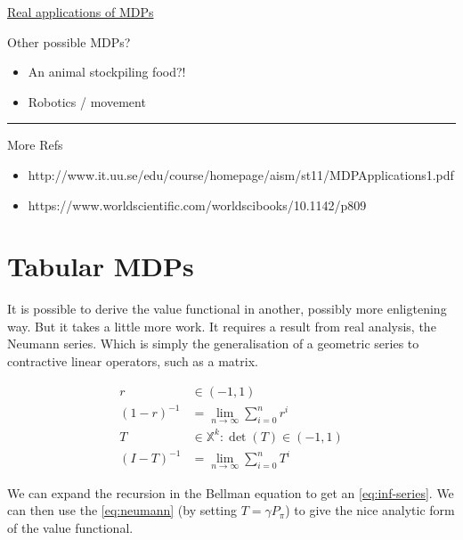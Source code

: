 \href{http://www.it.uu.se/edu/course/homepage/aism/st11/MDPApplications1.pdf}{Real
applications of MDPs}

Other possible MDPs?

\begin{itemize}
\tightlist
\item
  An animal stockpiling food?!
\item
  Robotics / movement
\end{itemize}

\begin{center}\rule{0.5\linewidth}{\linethickness}\end{center}

More Refs

\begin{itemize}
\tightlist
\item
  http://www.it.uu.se/edu/course/homepage/aism/st11/MDPApplications1.pdf
\item
  https://www.worldscientific.com/worldscibooks/10.1142/p809
\end{itemize}

\section{Tabular MDPs}\label{vf-neumann}

It is possible to derive the value functional in another, possibly more enligtening way. But it takes a little more work. It requires a result from real analysis, the Neumann series. Which is simply the generalisation of a geometric series to contractive linear operators, such as a matrix.

\begin{align*}
r &\in (-1, 1) \\
(1-r)^{-1} &= \lim_{n\to \infty} \sum_{i=0}^n r^i \tag{Geometric series}\\
T &\in \mathbb X^k: \det(T) \in (-1, 1) \\
(I-T)^{-1} &= \lim_{n\to \infty} \sum_{i=0}^n T^i \label{eq:neumann}\tag{Neumann series}
\end{align*}

We can expand the recursion in the Bellman equation to get an \eqref{eq:inf-series}. We can then use the \eqref{eq:neumann} (by setting $T=\gamma P_{\pi}$) to give the nice analytic form of the value functional.

